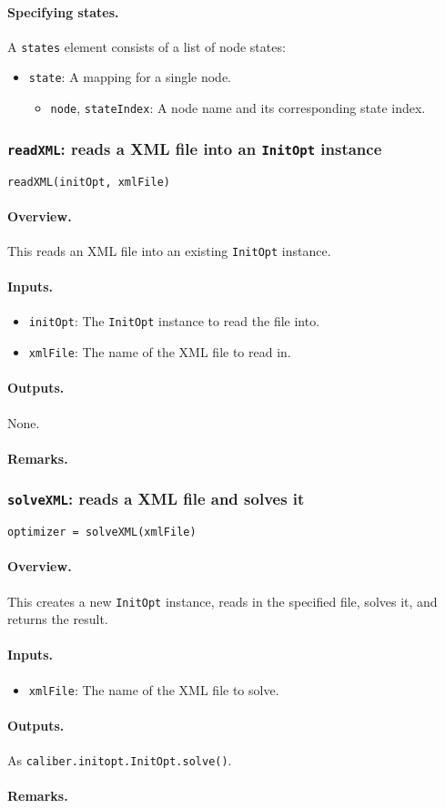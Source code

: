 \paragraph{Specifying states.}
A \texttt{states} element consists of a list of node states:
\begin{itemize}
	\item \texttt{state}: A mapping for a single node.
	\begin{itemize}
		\item \texttt{node}, \texttt{stateIndex}: A node name and its corresponding 
		state index.
	\end{itemize}
\end{itemize}

\subsubsection{\texttt{readXML}: reads a XML file into an \texttt{InitOpt} instance}
\texttt{readXML(initOpt, xmlFile)}
\paragraph{Overview.}
This reads an XML file into an existing \texttt{InitOpt} instance.
\paragraph{Inputs.}
\begin{itemize}
	\item \texttt{initOpt}: The \texttt{InitOpt} instance to read the file into.
	\item \texttt{xmlFile}: The name of the XML file to read in.
\end{itemize}
\paragraph{Outputs.}
None.
\paragraph{Remarks.}
\subsubsection{\texttt{solveXML}: reads a XML file and solves it}
\texttt{optimizer = solveXML(xmlFile)}
\paragraph{Overview.}
This creates a new \texttt{InitOpt} instance, reads in the specified file, solves it, and returns the result.
\paragraph{Inputs.}
\begin{itemize}
	\item \texttt{xmlFile}: The name of the XML file to solve.
\end{itemize}
\paragraph{Outputs.}
As \texttt{caliber.initopt.InitOpt.solve()}.
\paragraph{Remarks.}